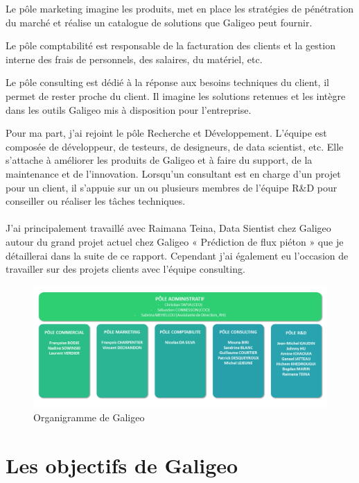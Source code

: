 Le pôle marketing imagine les produits, met en place les stratégies de pénétration du marché et réalise un catalogue de solutions que Galigeo peut fournir.

Le pôle comptabilité est responsable de la facturation des clients et la gestion interne des frais de personnels, des salaires, du matériel, etc.

Le pôle consulting est dédié à la réponse aux besoins techniques du client, il permet de rester proche du client. Il imagine les solutions retenues et les intègre dans les outils Galigeo mis à disposition pour l’entreprise.


Pour ma part, j’ai rejoint le pôle Recherche et Développement. L’équipe est composée de développeur, de testeurs, de designeurs, de data scientist, etc. Elle s’attache à améliorer les produits de Galigeo et à faire du support, de la maintenance et de l’innovation. Lorsqu’un consultant est en charge d’un projet pour un client, il s’appuie sur un ou plusieurs membres de l’équipe R\&D pour conseiller ou réaliser les tâches techniques.

\paragraph*{}

J’ai principalement travaillé avec Raimana Teina, Data Sientist chez Galigeo autour du grand projet actuel chez Galigeo « Prédiction de flux piéton » que je détaillerai dans la suite de ce rapport. Cependant j’ai également eu l’occasion de travailler sur des projets clients avec l’équipe consulting. 

\begin{figure}[H]
    \centering
    \includegraphics[width=\linewidth]{images/graphs/organigramme.png}
    \caption{Organigramme de Galigeo}
    \label{fig:organigrame}
\end{figure}


\section{Les objectifs de Galigeo}


